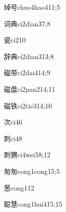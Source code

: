 \begin{verbete}{绰号}{chuo4hao4}{11;5}
\end{verbete}

\begin{verbete}{词典}{ci2dian3}{7;8}
\end{verbete}

\begin{verbete}{瓷}{ci2}{10}
\end{verbete}

\begin{verbete}{辞典}{ci2dian3}{13;8}
\end{verbete}

\begin{verbete}{磁带}{ci2dai4}{14;9}
\end{verbete}

\begin{verbete}{磁盘}{ci2pan2}{14;11}
\end{verbete}

\begin{verbete}{磁铁}{ci2tie3}{14;10}
\end{verbete}

\begin{verbete}{次}{ci4}{6}
\end{verbete}

\begin{verbete}{刺}{ci4}{8}
\end{verbete}

\begin{verbete}{刺猬}{ci4wei5}{8;12}
\end{verbete}

\begin{verbete}{匆匆}{cong1cong1}{5;5}
\end{verbete}

\begin{verbete}{葱}{cong1}{12}
\end{verbete}

\begin{verbete}{聪慧}{cong1hui4}{15;15}
\end{verbete}

